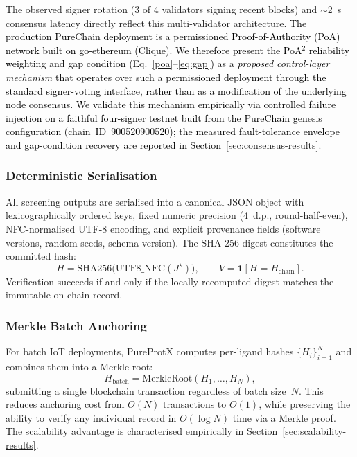 \documentclass[conference]{IEEEtran}
\begin{document}
The observed signer rotation (3 of 4 validators signing
recent blocks) and $\sim$2~s consensus latency directly
reflect this multi-validator architecture.
\textcolor{black}{The production PureChain deployment is a
permissioned Proof-of-Authority (PoA) network built on
go-ethereum (Clique). We therefore present the PoA$^2$
reliability weighting and gap condition
(Eq.~\ref{poa}--\ref{eq:gap}) as a \emph{proposed
control-layer mechanism} that operates over such a
permissioned deployment through the standard signer-voting
interface, rather than as a modification of the underlying
node consensus. We validate this mechanism empirically via
controlled failure injection on a faithful four-signer
testnet built from the PureChain genesis configuration
(chain~ID~900520900520); the measured fault-tolerance
envelope and gap-condition recovery are reported in
Section~\ref{sec:consensus-results}.}

\subsubsection{Deterministic Serialisation}

All screening outputs are serialised into a canonical JSON
object with lexicographically ordered keys, fixed numeric
precision (4~d.p., round-half-even), NFC-normalised UTF-8
encoding, and explicit provenance fields (software versions,
random seeds, schema version).
The SHA-256 digest constitutes the committed hash:
\begin{equation}
\label{eq:hash}
H = \mathrm{SHA256}\!\bigl(\mathrm{UTF8\_NFC}(J^\star)\bigr),
\qquad
V = \mathbf{1}[H = H_{\mathrm{chain}}].
\end{equation}
Verification succeeds if and only if the locally recomputed
digest matches the immutable on-chain record.

\subsubsection{Merkle Batch Anchoring}

For batch IoT deployments, PureProtX computes per-ligand
hashes $\{H_i\}_{i=1}^N$ and combines them into a Merkle
root:
\begin{equation}
H_{\mathrm{batch}} = \mathrm{MerkleRoot}(H_1, \ldots, H_N),
\end{equation}
submitting a single blockchain transaction regardless of
batch size~$N$.
This reduces anchoring cost from $O(N)$ transactions to
$O(1)$, while preserving the ability to verify any
individual record in $O(\log N)$ time via a Merkle proof.
The scalability advantage is characterised empirically
in Section~\ref{sec:scalability-results}.
\end{document}
